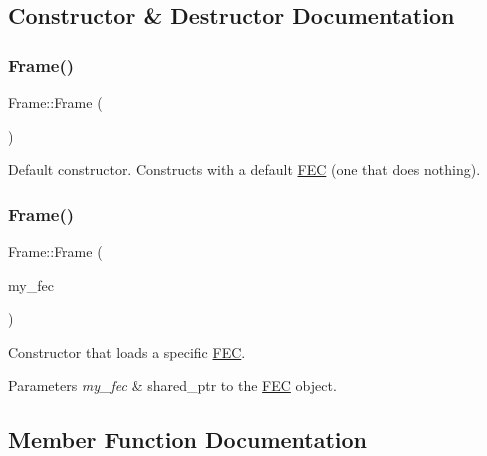 \subsection{Constructor \& Destructor Documentation}
\mbox{\label{classFrame_ad2e5946cf41d4817e750500acf05d02b}} 
\subsubsection{\texorpdfstring{Frame()}{Frame()}\hspace{0.1cm}{\footnotesize\ttfamily [1/2]}}
{\footnotesize\ttfamily Frame\+::\+Frame (\begin{DoxyParamCaption}{ }\end{DoxyParamCaption})\hspace{0.3cm}{\ttfamily [inline]}}

Default constructor. Constructs with a default \hyperlink{classFEC}{F\+EC} (one that does nothing). \mbox{\label{classFrame_a230b093686859a8d614b81b19f0433a0}} 
\subsubsection{\texorpdfstring{Frame()}{Frame()}\hspace{0.1cm}{\footnotesize\ttfamily [2/2]}}
{\footnotesize\ttfamily Frame\+::\+Frame (\begin{DoxyParamCaption}\item[{shared\+\_\+ptr$<$ \hyperlink{classFEC}{F\+EC} $>$}]{my\+\_\+fec }\end{DoxyParamCaption})\hspace{0.3cm}{\ttfamily [inline]}}

Constructor that loads a specific \hyperlink{classFEC}{F\+EC}. 
\begin{DoxyParams}{Parameters}
{\em my\+\_\+fec} & shared\+\_\+ptr to the \hyperlink{classFEC}{F\+EC} object. \\
\hline
\end{DoxyParams}


\subsection{Member Function Documentation}
\mbox{\label{classFrame_a84bdc2969f8962206c89c5f916d80973}} 

